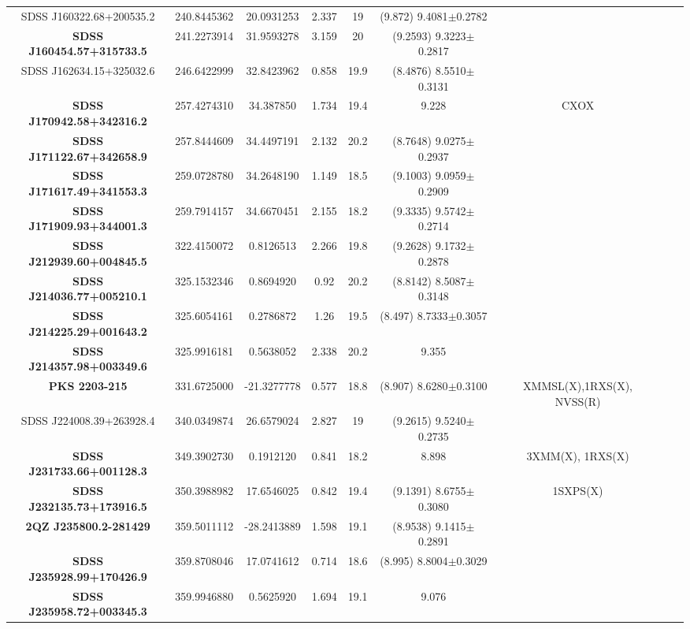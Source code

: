 \begin{table}
\begin{tabular}{|c| c| c| c| c| c| c| c| c|}
SDSS J160322.68+200535.2 		&240.8445362		&20.0931253		&2.337			&19			&(9.872) 9.4081$\pm$0.2782	&\\
\textbf{SDSS J160454.57+315733.5} 		&241.2273914		&31.9593278		&3.159			&20			&(9.2593) 9.3223$\pm$0.2817&\\
SDSS J162634.15+325032.6 		&246.6422999		&32.8423962		&0.858			&19.9		&(8.4876)	 8.5510$\pm$0.3131&\\
\textbf{SDSS J170942.58+342316.2} 		&257.4274310		&34.387850			&1.734			&19.4		&9.228		&CXOX \\
\textbf{SDSS J171122.67+342658.9} 		&257.8444609		&34.4497191		&2.132			&20.2		&(8.7648)	 9.0275$\pm$0.2937&\\
\textbf{SDSS J171617.49+341553.3} 		&259.0728780 	&34.2648190		&1.149			&18.5		&(9.1003) 9.0959$\pm$0.2909&\\
\textbf{SDSS J171909.93+344001.3} 		&259.7914157		&34.6670451		&2.155			&18.2		&(9.3335) 9.5742$\pm$0.2714&\\
\textbf{SDSS J212939.60+004845.5} 		&322.4150072		&0.8126513			&2.266			&19.8		&(9.2628)	 9.1732$\pm$0.2878&\\
\textbf{SDSS J214036.77+005210.1}		&325.1532346		&0.8694920			&0.92			&20.2		&(8.8142) 8.5087$\pm$0.3148	&\\
\textbf{SDSS J214225.29+001643.2} 		&325.6054161		&0.2786872			&1.26			&19.5		&(8.497) 8.7333$\pm$0.3057		&\\
\textbf{SDSS J214357.98+003349.6}		&325.9916181		&0.5638052			&2.338			&20.2		&9.355		&\\
\textbf{PKS 2203-215}				            	&331.6725000		&-21.3277778		&0.577			&18.8		&(8.907) 8.6280$\pm$0.3100	& XMMSL(X),1RXS(X), NVSS(R)  \\
SDSS J224008.39+263928.4 		&340.0349874		&26.6579024		&2.827			&19			&(9.2615) 9.5240$\pm$0.2735&\\
\textbf{SDSS J231733.66+001128.3} 		&349.3902730		&0.1912120			&0.841			&18.2		&8.898		&3XMM(X), 1RXS(X) \\
\textbf{SDSS J232135.73+173916.5} 		&350.3988982		&17.6546025		&0.842			&19.4		&(9.1391) 8.6755$\pm$0.3080	& 1SXPS(X) \\
\textbf{2QZ J235800.2-281429}		    	&359.5011112		&-28.2413889		&1.598			&19.1		&(8.9538) 9.1415$\pm$0.2891	&\\
\textbf{SDSS J235928.99+170426.9} 		&359.8708046		&17.0741612		&0.714			&18.6		&(8.995) 8.8004$\pm$0.3029		&\\
\textbf{SDSS J235958.72+003345.3} 		&359.9946880		&0.5625920			&1.694			&19.1		&9.076		&\\

\end{tabular}
\end{table}
